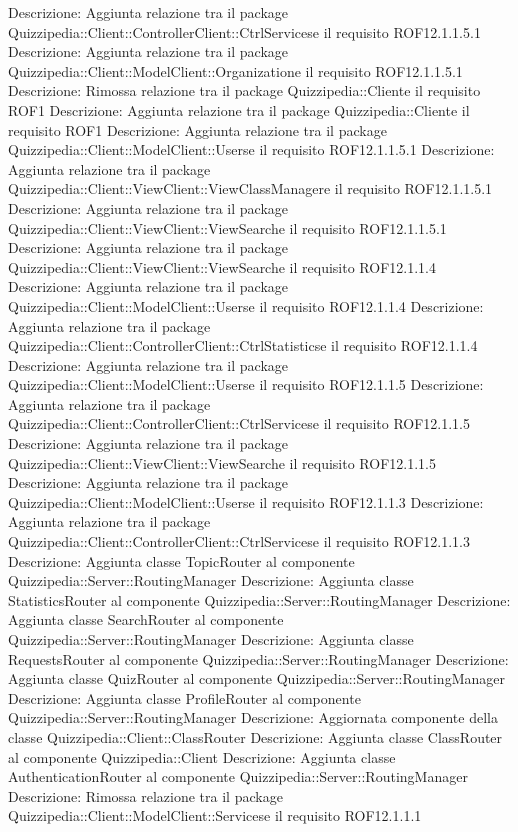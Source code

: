 Descrizione: Aggiunta relazione tra il package Quizzipedia::Client::ControllerClient::CtrlServicese il requisito ROF12.1.1.5.1 
Descrizione: Aggiunta relazione tra il package Quizzipedia::Client::ModelClient::Organizatione il requisito ROF12.1.1.5.1 
Descrizione: Rimossa relazione tra il package Quizzipedia::Cliente il requisito ROF1 
Descrizione: Aggiunta relazione tra il package Quizzipedia::Cliente il requisito ROF1 
Descrizione: Aggiunta relazione tra il package Quizzipedia::Client::ModelClient::Userse il requisito ROF12.1.1.5.1 
Descrizione: Aggiunta relazione tra il package Quizzipedia::Client::ViewClient::ViewClassManagere il requisito ROF12.1.1.5.1 
Descrizione: Aggiunta relazione tra il package Quizzipedia::Client::ViewClient::ViewSearche il requisito ROF12.1.1.5.1 
Descrizione: Aggiunta relazione tra il package Quizzipedia::Client::ViewClient::ViewSearche il requisito ROF12.1.1.4 
Descrizione: Aggiunta relazione tra il package Quizzipedia::Client::ModelClient::Userse il requisito ROF12.1.1.4 
Descrizione: Aggiunta relazione tra il package Quizzipedia::Client::ControllerClient::CtrlStatisticse il requisito ROF12.1.1.4 
Descrizione: Aggiunta relazione tra il package Quizzipedia::Client::ModelClient::Userse il requisito ROF12.1.1.5 
Descrizione: Aggiunta relazione tra il package Quizzipedia::Client::ControllerClient::CtrlServicese il requisito ROF12.1.1.5 
Descrizione: Aggiunta relazione tra il package Quizzipedia::Client::ViewClient::ViewSearche il requisito ROF12.1.1.5 
Descrizione: Aggiunta relazione tra il package Quizzipedia::Client::ModelClient::Userse il requisito ROF12.1.1.3 
Descrizione: Aggiunta relazione tra il package Quizzipedia::Client::ControllerClient::CtrlServicese il requisito ROF12.1.1.3 
Descrizione: Aggiunta classe TopicRouter al componente Quizzipedia::Server::RoutingManager 
Descrizione: Aggiunta classe StatisticsRouter al componente Quizzipedia::Server::RoutingManager 
Descrizione: Aggiunta classe SearchRouter al componente Quizzipedia::Server::RoutingManager 
Descrizione: Aggiunta classe RequestsRouter al componente Quizzipedia::Server::RoutingManager 
Descrizione: Aggiunta classe QuizRouter al componente Quizzipedia::Server::RoutingManager 
Descrizione: Aggiunta classe ProfileRouter al componente Quizzipedia::Server::RoutingManager 
Descrizione: Aggiornata componente della classe Quizzipedia::Client::ClassRouter 
Descrizione: Aggiunta classe ClassRouter al componente Quizzipedia::Client 
Descrizione: Aggiunta classe AuthenticationRouter al componente Quizzipedia::Server::RoutingManager 
Descrizione: Rimossa relazione tra il package Quizzipedia::Client::ModelClient::Servicese il requisito ROF12.1.1.1 
